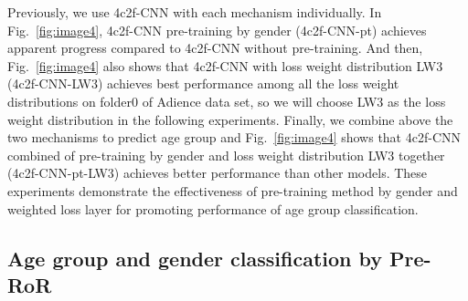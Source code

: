 \documentclass[journal]{IEEEtran}
\begin{document}
\par
Previously, we use 4c2f-CNN with each mechanism individually. In Fig.~\ref{fig:image4}, 4c2f-CNN pre-training by gender (4c2f-CNN-pt) achieves apparent progress compared to 4c2f-CNN without pre-training. And then, Fig.~\ref{fig:image4} also shows that 4c2f-CNN with loss weight distribution LW3 (4c2f-CNN-LW3) achieves best performance among all the loss weight distributions on folder0 of Adience data set, so we will choose LW3 as the loss weight distribution in the following experiments. Finally, we combine above the two mechanisms to predict age group and Fig.~\ref{fig:image4} shows that 4c2f-CNN combined of pre-training by gender and loss weight distribution LW3 together (4c2f-CNN-pt-LW3) achieves better performance than other models. These experiments demonstrate the effectiveness of pre-training method by gender and weighted loss layer for promoting performance of age group classification.





\subsection{Age group and gender classification by Pre-RoR}
\end{document}
